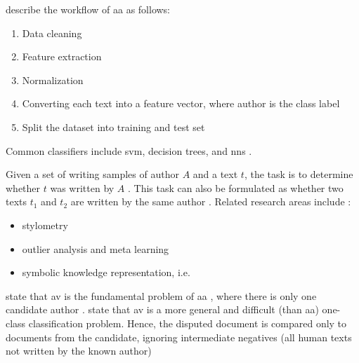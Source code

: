 \citet{elmanarelbouanani_authorship_2014} describe the workflow of \ac{aa} as follows:
\begin{enumerate}
    \item Data cleaning
    \item Feature extraction
    \item Normalization
    \item Converting each text into a feature vector, where author is the class label
    \item Split the dataset into training and test set
\end{enumerate}
Common classifiers include \ac{svm}, decision trees, and \acp{nn} \cite{elmanarelbouanani_authorship_2014}.

\begin{definition}
    [\ac{av}]   %
    Given a set of writing samples of author $A$ and a text $t$,    %
    the task is to determine whether $t$ was written by $A$ \cite{stein_intrinsic_2011,stamatatos_survey_2009,koppel_authorship_2011,tyo_state_2022,kocher_unine_2015,koppel_authorship_2004}.
    This task can also be formulated as whether two texts $t_1$ and $t_2$ are written by the same author 
    \cite{bevendorff_generalizing_2019,bevendorff_divergence_based_2020,embarcadero_ruiz_graph_based_2022,rivera_soto_learning_2021,ordonez_will_2020,futrzynski_pairwise_2021,weerasinghe_feature_vector_difference_2021,llm_detection_av_2025}.
    Related research areas include \cite{stein_intrinsic_2011}:
    \begin{itemize}
        \item stylometry
        \item outlier analysis and meta learning
        \item symbolic knowledge representation, i.e. 
    \end{itemize}
    \citet{tyo_state_2022} state that \ac{av} is the fundamental problem of \ac{aa} \cite{tyo_state_2022}, 
    where there is only one candidate author \cite{barlas_cross_domain_2020}.
    \citet{llm_detection_av_2025,koppel_authorship_2004} state that \ac{av} is a more general and difficult (than \ac{aa}) one-class classification problem.
    Hence, the disputed document is compared only to documents from the candidate, 
    ignoring intermediate negatives (all human texts not written by the known author) 

\end{definition}
